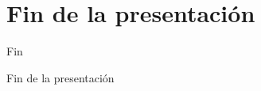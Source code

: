 \documentclass{beamer}
\begin{document}
\section*{Fin de la presentación}

\begin{frame}{Fin}
\begin{center}
\huge{Fin de la presentación}
\end{center}
\end{frame}
\end{document}
